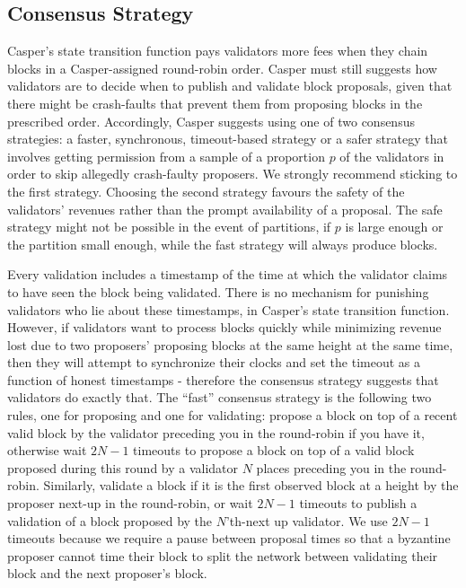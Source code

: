 \documentclass[11pt,a4paper]{article}
\begin{document}
\subsection{Consensus Strategy}

Casper's state transition function pays validators more fees when they chain blocks in a Casper-assigned round-robin order. Casper must still suggests how validators are to decide when to publish and validate block proposals, given that there might be crash-faults that prevent them from proposing blocks in the prescribed order. Accordingly, Casper suggests using one of two consensus strategies: a faster, synchronous, timeout-based strategy or a safer strategy that involves getting permission from a sample of a proportion $p$ of the validators in order to skip allegedly crash-faulty proposers. We strongly recommend sticking to the first strategy. Choosing the second strategy favours the safety of the validators' revenues rather than the prompt availability of a proposal. The safe strategy might not be possible in the event of partitions, if $p$ is large enough or the partition small enough, while the fast strategy will always produce blocks.

Every validation includes a timestamp of the time at which the validator claims to have seen the block being validated. There is no mechanism for punishing validators who lie about these timestamps, in Casper's state transition function. However, if validators want to process blocks quickly while minimizing revenue lost due to two proposers' proposing blocks at the same height at the same time, then they will attempt to synchronize their clocks and set the timeout as a function of honest timestamps - therefore the consensus strategy suggests that validators do exactly that. The ``fast'' consensus strategy is the following two rules, one for proposing and one for validating: propose a block on top of a recent valid block by the validator preceding you in the round-robin if you have it, otherwise wait $2N - 1$ timeouts to propose a block on top of a valid block proposed during this round by a validator $N$ places preceding you in the round-robin. Similarly, validate a block if it is the first observed block at a height by the proposer next-up in the round-robin, or wait $2N - 1$ timeouts to publish a validation of a block proposed by the $N$'th-next up validator. We use $2N - 1$ timeouts because we require a pause between proposal times so that a byzantine proposer cannot time their block to split the network between validating their block and the next proposer's block.
\end{document}
